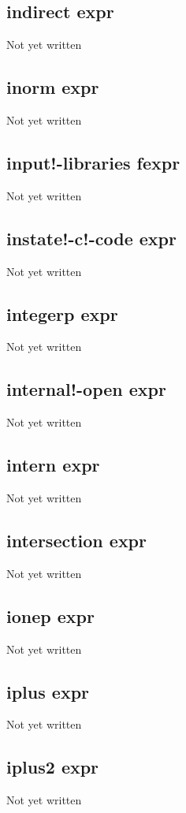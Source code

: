 \documentclass[a4paper,11pt]{article}
\begin{document}
{\subsection{\ttfamily indirect expr}
Not yet written

\subsection{\ttfamily inorm expr}
Not yet written

\subsection{\ttfamily input!-libraries fexpr}
Not yet written

\subsection{\ttfamily instate!-c!-code expr}
Not yet written

\subsection{\ttfamily integerp expr}
Not yet written

\subsection{\ttfamily internal!-open expr}
Not yet written

\subsection{\ttfamily intern expr}
Not yet written

\subsection{\ttfamily intersection expr}
Not yet written

\subsection{\ttfamily ionep expr}
Not yet written

\subsection{\ttfamily iplus expr}
Not yet written

\subsection{\ttfamily iplus2 expr}
Not yet written

}
\end{document}
